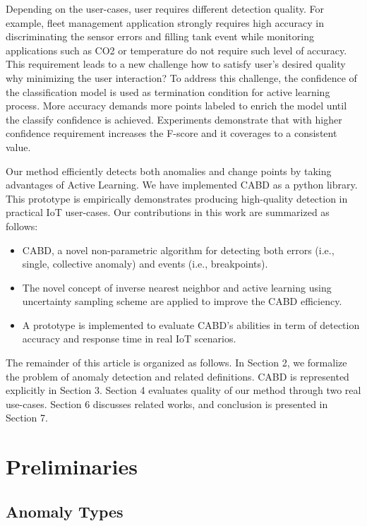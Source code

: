 \par Depending on the user-cases, user requires different detection quality. For example, fleet management application strongly requires high accuracy in discriminating the sensor errors and filling tank event while monitoring applications such as CO2 or temperature do not require such level of accuracy. This requirement leads to a new challenge how to satisfy user's desired quality why minimizing the user interaction? To address this challenge, the confidence of the classification model is used as termination condition for active learning process. More accuracy demands more points labeled to enrich the model until the classify confidence is achieved. Experiments demonstrate that with higher confidence requirement increases the F-score and it coverages to a consistent value.\\

\par Our method efficiently detects both anomalies and change points by taking advantages of Active Learning. We have implemented CABD as a python library. This prototype is empirically demonstrates producing high-quality detection in practical IoT user-cases. Our contributions in this work are summarized as follows:
\begin{itemize}
	\item CABD, a novel non-parametric algorithm for detecting both errors (i.e., single, collective anomaly) and events (i.e., breakpoints). 
	\item The novel concept of inverse nearest neighbor and active learning using uncertainty sampling scheme are applied to improve the CABD efficiency. 
	\item A prototype is implemented to evaluate CABD’s abilities in term of detection accuracy and response time in real IoT scenarios.
\end{itemize}
\par The remainder of this article is organized as follows. In Section 2, we formalize the problem of anomaly detection and related definitions. CABD is represented explicitly in Section 3. Section 4 evaluates quality of our method through two real use-cases. Section 6 discusses related works, and conclusion is presented in Section 7.  

\section{Preliminaries}
\subsection{Anomaly Types}

